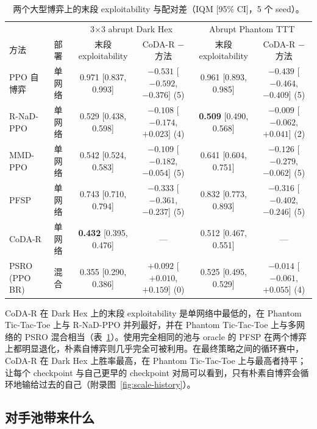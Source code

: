 \documentclass{article}
\theoremstyle{plain}
\theoremstyle{remark}
\newcommand{\codar}{CoDA-R}
\newcommand{\rnad}{R-NaD-PPO}
\begin{document}
\begin{table}[t]
\caption{两个大型博弈上的末段 exploitability 与配对差（IQM [95\% CI]，5 个 seed）。}
\label{tab:scale}
\begin{center}
\scriptsize
\setlength{\tabcolsep}{3pt}
\begin{tabular}{llcccc}
\toprule
 & & \multicolumn{2}{c}{3$\times$3 abrupt Dark Hex} & \multicolumn{2}{c}{Abrupt Phantom TTT} \\
方法 & 部署 & 末段 exploitability & \codar{} $-$ 方法 & 末段 exploitability & \codar{} $-$ 方法 \\
\midrule
PPO 自博弈 & 单网络 & 0.971 [0.837, 0.993] & $-0.531$ [$-0.592$, $-0.376$] (5) & 0.961 [0.893, 0.985] & $-0.439$ [$-0.464$, $-0.409$] (5) \\
\rnad{} & 单网络 & 0.529 [0.438, 0.598] & $-0.108$ [$-0.174$, $+0.023$] (4) & \textbf{0.509} [0.490, 0.568] & $-0.009$ [$-0.062$, $+0.041$] (2) \\
MMD-PPO & 单网络 & 0.542 [0.524, 0.583] & $-0.109$ [$-0.182$, $-0.054$] (5) & 0.641 [0.604, 0.751] & $-0.126$ [$-0.279$, $-0.062$] (5) \\
PFSP & 单网络 & 0.743 [0.710, 0.794] & $-0.333$ [$-0.361$, $-0.237$] (5) & 0.832 [0.773, 0.893] & $-0.316$ [$-0.402$, $-0.246$] (5) \\
\codar{} & 单网络 & \textbf{0.432} [0.395, 0.476] & --- & 0.512 [0.467, 0.551] & --- \\
\midrule
PSRO (PPO BR) & 混合 & 0.355 [0.290, 0.386] & $+0.092$ [$+0.010$, $+0.159$] (0) & 0.525 [0.495, 0.529] & $-0.014$ [$-0.061$, $+0.055$] (4) \\
\bottomrule
\end{tabular}
\end{center}
\end{table}

\codar{} 在 Dark Hex 上的末段 exploitability 是单网络中最低的，在 Phantom Tic-Tac-Toe 上与 \rnad{} 并列最好，并在 Phantom Tic-Tac-Toe 上与多网络的 PSRO 混合相当（表~\ref{tab:scale}）。使用完全相同的池与 oracle 的 PFSP 在两个博弈上都明显退化，朴素自博弈则几乎完全可被利用。在最终策略之间的循环赛中，\codar{} 在 Dark Hex 上胜率最高，在 Phantom Tic-Tac-Toe 上与最高者持平；让每个 checkpoint 与自己更早的 checkpoint 对局可以看到，只有朴素自博弈会循环地输给过去的自己（附录图~\ref{fig:scale-history}）。

\subsection{对手池带来什么}
\label{sec:exp-mech}
\end{document}
